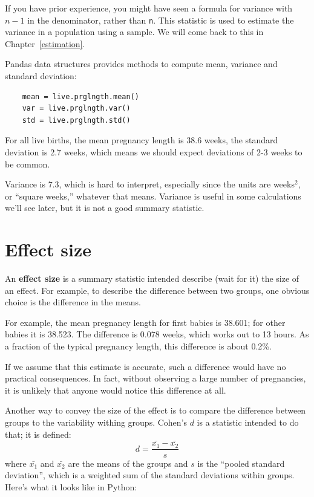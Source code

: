\documentclass[12pt]{book}
\begin{document}
If you have prior experience, you might have seen a formula for
variance with $n-1$ in the denominator, rather than {\tt n}.  This
statistic is used to estimate the variance in a population using a
sample.  We will come back to this in Chapter~\ref{estimation}.

Pandas data structures provides methods to compute mean, variance and
standard deviation:

\begin{verbatim}
    mean = live.prglngth.mean()
    var = live.prglngth.var()
    std = live.prglngth.std()
\end{verbatim}

For all live births, the mean pregnancy length is 38.6 weeks, the
standard deviation is 2.7 weeks, which means we should expect
deviations of 2-3 weeks to be common.

Variance is 7.3, which is hard to interpret, especially since the
units are weeks$^2$, or ``square weeks,'' whatever that means.
Variance is useful in some calculations we'll see later, but it is not
a good summary statistic.


\section{Effect size}

An {\bf effect size} is a summary statistic intended describe (wait
for it) the size of an effect.  For example, to describe the
difference between two groups, one obvious choice is the difference in
the means.  

For example, the mean pregnancy length for first babies is 38.601; for
other babies it is 38.523.  The difference is 0.078 weeks, which works
out to 13 hours.  As a fraction of the typical pregnancy length, this
difference is about 0.2\%.

If we assume that this estimate is accurate, such a difference
would have no practical consequences.  In fact, without
observing a large number of pregnancies, it is unlikely that anyone
would notice this difference at all.

Another way to convey the size of the effect is to compare the
difference between groups to the variability withing groups.
Cohen's $d$ is a statistic intended to do that; it is defined:
%
\[ d = \frac{\bar{x_1} - \bar{x_2}}{s}  \]
%
where $\bar{x_1}$ and $\bar{x_2}$ are the means of the groups and
$s$ is the ``pooled standard deviation'', which is a weighted sum of
the standard deviations within groups.  Here's what it looks like in
Python:
\end{document}
